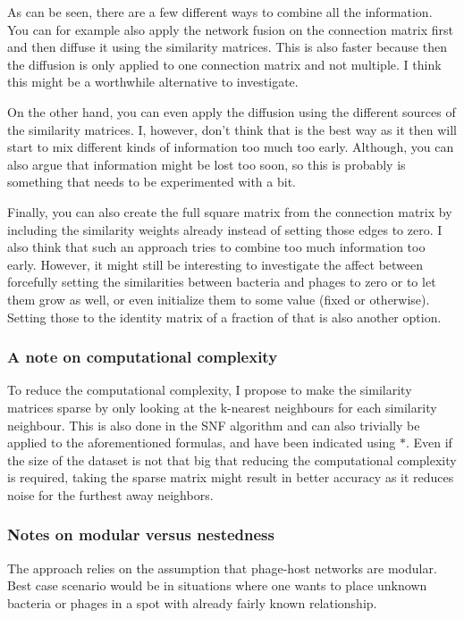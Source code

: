 \documentclass{article}
\begin{document}
As can be seen, there are a few different ways to combine all the information.
You can for example also apply the network fusion on the connection matrix
first and then diffuse it using the similarity matrices. This is also 
faster because then the diffusion is only applied to one connection matrix
and not multiple. I think this might be a worthwhile alternative to investigate.

On the other hand, you can even apply the diffusion
using the different sources of the similarity matrices. I, however, don't
think that is the best way as it then will start to mix different kinds 
of information too much too early. Although, you can also argue that information
might be lost too soon, so this is probably is something that needs to be
experimented with a bit.

Finally, you can
also create the full square matrix from the connection matrix by including the
similarity weights already instead of setting those edges to zero. I also 
think that such an approach tries to combine too much information too early.
However, it might still be interesting to investigate the affect between
forcefully setting the similarities between bacteria and phages to zero 
or to let them grow as well, or even initialize them to some value (fixed
or otherwise). Setting those to the identity matrix of a fraction of that 
is also another option.

\subsubsection{A note on computational complexity}

To reduce the computational complexity, I propose to make the similarity matrices sparse by only
looking at the k-nearest neighbours for each similarity neighbour.
This is also done in the SNF algorithm and can also trivially be applied 
to the aforementioned formulas, and have been indicated using $*$.
Even if the size of the dataset is not that big that reducing the
computational complexity is required, taking the sparse matrix might 
result in better accuracy as it reduces noise for the furthest away neighbors.

\subsubsection{Notes on modular versus nestedness}

The approach relies on the assumption that phage-host networks are
modular. Best case scenario would be in situations where one wants to place
unknown bacteria or phages in a spot with already fairly known relationship. 
\end{document}

